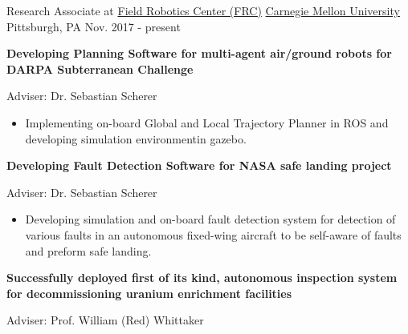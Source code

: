 



\begin{cventries}







  \cventry
    {Research Associate at \href{https://www.frc.ri.cmu.edu/}{Field Robotics Center (FRC)}} %
    {\href{https://www.ri.cmu.edu/}{Carnegie Mellon University}} %
    {Pittsburgh, PA} %
    {Nov. 2017 - present} %
    {
      \begin{cvitems} %
      	\item \textbf{Developing Planning Software for multi-agent air/ground robots for DARPA Subterranean Challenge} \begin{flushright} {\color{awesome} Adviser: Dr. Sebastian Scherer} \end{flushright}
		\begin{itemize}
			\item Implementing on-board Global and Local Trajectory Planner in ROS and developing simulation environmentin gazebo.
		\end{itemize}
		\item \textbf{Developing Fault Detection Software for NASA safe landing project} \begin{flushright} {\color{awesome} Adviser: Dr. Sebastian Scherer} \end{flushright}
		\begin{itemize}
			\item Developing simulation and on-board fault detection system for detection of various faults in an autonomous fixed-wing aircraft to be self-aware of faults and preform safe landing.
		\end{itemize}
		\item \textbf{Successfully deployed first of its kind, autonomous inspection system for decommissioning
uranium enrichment facilities} \begin{flushright} {\color{awesome} Adviser: Prof. William (Red) Whittaker} \end{flushright}

\end{cvitems}}
\end{cventries}
